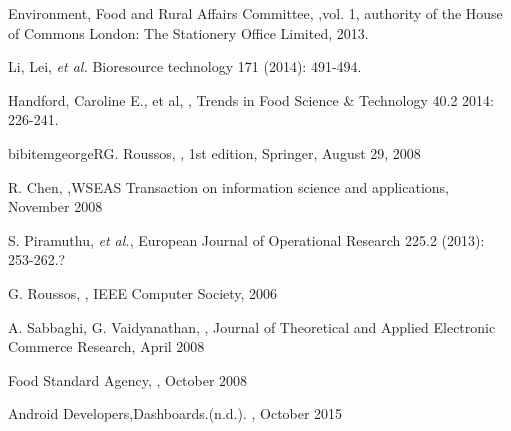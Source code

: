 \documentclass[a4paper, 11pt]{article}
\begin{document}
\begin{thebibliography}{29}
Environment, Food and Rural Affairs Committee, \emph{},vol. 1, authority of the House of Commons London: The Stationery Office Limited, 2013.
\vspace{\baselineskip}

Li, Lei, \emph{et al.} \emph{} Bioresource technology 171 (2014): 491-494.
\vspace{\baselineskip}

Handford, Caroline E., et al, \emph{}, Trends in Food Science \& Technology 40.2 2014: 226-241.
\vspace{\baselineskip}

bibitem{georgeR}G. Roussos, \emph{}, 1st edition, Springer, August 29, 2008
\vspace{\baselineskip}

 R. Chen, \emph{},WSEAS Transaction on information science and applications, November 2008
\vspace{\baselineskip}

S. Piramuthu, \emph{et al.}, \emph{} European Journal of Operational Research 225.2 (2013): 253-262.?\vspace{\baselineskip}

G. Roussos, \emph{}, IEEE Computer Society, 2006
\vspace{\baselineskip}

A. Sabbaghi, G. Vaidyanathan, \emph{}, Journal of Theoretical and Applied Electronic Commerce Research, April 2008

Food Standard Agency, \emph{}, October 2008
\vspace{\baselineskip}

Android Developers,Dashboards.(n.d.). \emph{}, October 2015
\vspace{\baselineskip}


\end{thebibliography}
\end{document}
